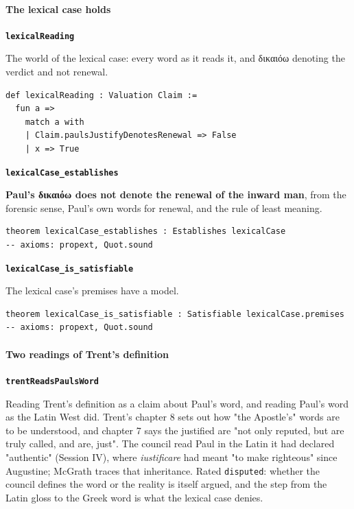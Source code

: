 \documentclass[11pt]{article}
\begin{document}
\paragraph*{The lexical case holds}
\leavevmode\par
\par\medskip\noindent\textbf{\texttt{lexical\allowbreak{}Reading}}\par\nobreak\noindent
The world of the lexical case: every word as it reads it, and δικαιόω denoting the verdict and not renewal.

{\small\begin{verbatim}
def lexicalReading : Valuation Claim :=
  fun a =>
    match a with
    | Claim.paulsJustifyDenotesRenewal => False
    | x => True
\end{verbatim}}
\par\medskip\noindent\textbf{\texttt{lexical\allowbreak{}Case\_\allowbreak{}establishes}}\par\nobreak\noindent
\textbf{Paul's δικαιόω does not denote the renewal of the inward man}, from the forensic sense, Paul's own words for renewal, and the rule of least meaning.

{\small\begin{verbatim}
theorem lexicalCase_establishes : Establishes lexicalCase
-- axioms: propext, Quot.sound
\end{verbatim}}
\par\medskip\noindent\textbf{\texttt{lexical\allowbreak{}Case\_\allowbreak{}is\_\allowbreak{}satisfiable}}\par\nobreak\noindent
The lexical case's premises have a model.

{\small\begin{verbatim}
theorem lexicalCase_is_satisfiable : Satisfiable lexicalCase.premises
-- axioms: propext, Quot.sound
\end{verbatim}}
\paragraph*{Two readings of Trent's definition}
\leavevmode\par
\par\medskip\noindent\textbf{\texttt{trent\allowbreak{}Reads\allowbreak{}Pauls\allowbreak{}Word}}\par\nobreak\noindent
Reading Trent's definition as a claim about Paul's word, and reading Paul's word as the Latin West did. Trent's chapter 8 sets out how "the Apostle's" words are to be understood, and chapter 7 says the justified are "not only reputed, but are truly called, and are, just". The council read Paul in the Latin it had declared "authentic" (Session IV), where \emph{iustificare} had meant "to make righteous" since Augustine; McGrath traces that inheritance. Rated \texttt{disputed}: whether the council defines the word or the reality is itself argued, and the step from the Latin gloss to the Greek word is what the lexical case denies.
\end{document}
